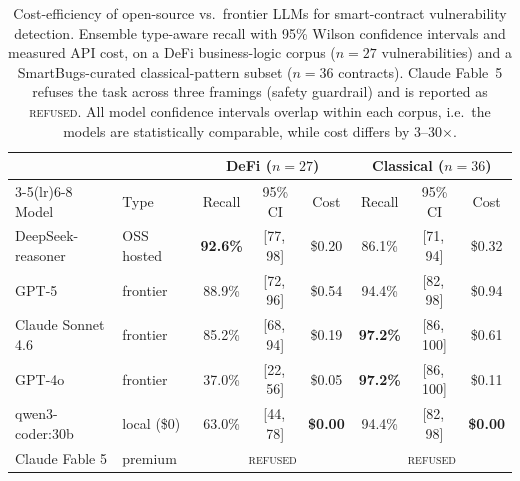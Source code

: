 \documentclass[a4paper,11pt]{article}
\begin{document}
\begin{table}[t]
\centering
\small
\caption{Cost-efficiency of open-source vs.\ frontier LLMs for smart-contract
vulnerability detection. Ensemble type-aware recall with 95\% Wilson confidence
intervals and measured API cost, on a DeFi business-logic corpus
($n{=}27$ vulnerabilities) and a SmartBugs-curated classical-pattern subset
($n{=}36$ contracts). Claude Fable~5 refuses the task across three framings
(safety guardrail) and is reported as \textsc{refused}. All model confidence
intervals overlap within each corpus, i.e.\ the models are statistically
comparable, while cost differs by 3--30$\times$.}
\label{tab:costeff}
\begin{tabular}{llccc ccc}
\toprule
 & & \multicolumn{3}{c}{DeFi ($n{=}27$)} & \multicolumn{3}{c}{Classical ($n{=}36$)} \\
\cmidrule(lr){3-5}\cmidrule(lr){6-8}
Model & Type & Recall & 95\% CI & Cost & Recall & 95\% CI & Cost \\
\midrule
DeepSeek-reasoner & OSS hosted    & \textbf{92.6\%} & [77,\,98]  & \$0.20 & 86.1\% & [71,\,94]  & \$0.32 \\
GPT-5             & frontier      & 88.9\%          & [72,\,96]  & \$0.54 & 94.4\% & [82,\,98]  & \$0.94 \\
Claude Sonnet 4.6 & frontier      & 85.2\%          & [68,\,94]  & \$0.19 & \textbf{97.2\%} & [86,\,100] & \$0.61 \\
GPT-4o            & frontier      & 37.0\%          & [22,\,56]  & \$0.05 & \textbf{97.2\%} & [86,\,100] & \$0.11 \\
qwen3-coder:30b   & local (\$0)   & 63.0\%          & [44,\,78]  & \textbf{\$0.00} & 94.4\% & [82,\,98] & \textbf{\$0.00} \\
Claude Fable 5    & premium       & \multicolumn{3}{c}{\textsc{refused}} & \multicolumn{3}{c}{\textsc{refused}} \\
\bottomrule
\end{tabular}
\end{table}
\end{document}
